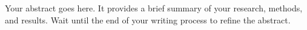 
Your abstract goes here. It provides a brief summary of your research, methods, and results. Wait until the end of your writing process to refine the abstract.